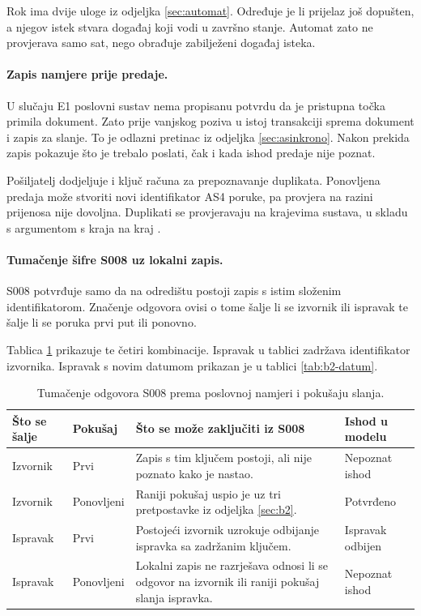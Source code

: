 Rok ima dvije uloge iz odjeljka \ref{sec:automat}. Određuje je li prijelaz
još dopušten, a njegov istek stvara događaj koji vodi u završno stanje.
Automat zato ne provjerava samo sat, nego obrađuje zabilježeni događaj
isteka.

\paragraph{Zapis namjere prije predaje.}
U slučaju E1 poslovni sustav nema propisanu potvrdu da je pristupna točka
primila dokument. Zato prije vanjskog poziva u istoj transakciji sprema
dokument i zapis za slanje. To je odlazni pretinac iz odjeljka
\ref{sec:asinkrono}. Nakon prekida zapis pokazuje što je trebalo poslati,
čak i kada ishod predaje nije poznat.

Pošiljatelj dodjeljuje i ključ računa za prepoznavanje duplikata. Ponovljena
predaja može stvoriti novi identifikator AS4 poruke, pa provjera na razini
prijenosa nije dovoljna. Duplikati se provjeravaju na krajevima sustava, u
skladu s argumentom s kraja na kraj \cite{saltzer1984endtoend}.

\paragraph{Tumačenje šifre S008 uz lokalni zapis.}
S008 potvrđuje samo da na odredištu postoji zapis s istim složenim
identifikatorom. Značenje odgovora ovisi o tome šalje li se izvornik ili
ispravak te šalje li se poruka prvi put ili ponovno.

Tablica \ref{tab:s008-tumacenje} prikazuje te četiri kombinacije. Ispravak
u tablici zadržava identifikator izvornika. Ispravak s novim datumom
prikazan je u tablici \ref{tab:b2-datum}.

\begin{table}[htbp]
\centering
\caption[Tumačenje S008 prema namjeri i pokušaju]{Tumačenje odgovora S008
prema poslovnoj namjeri i pokušaju slanja.}
\label{tab:s008-tumacenje}
\small
\begin{tabular}{@{}>{\raggedright\arraybackslash}p{}>{\raggedright\arraybackslash}p{}>{\raggedright\arraybackslash}p{}>{\raggedright\arraybackslash}p{}@{}}
\toprule
Što se šalje & Pokušaj & Što se može zaključiti iz S008 & Ishod u modelu \\
\midrule
Izvornik & Prvi & Zapis s tim ključem postoji, ali nije poznato kako je
nastao. & Nepoznat ishod \\
\addlinespace
Izvornik & Ponovljeni & Raniji pokušaj uspio je uz tri pretpostavke iz
odjeljka \ref{sec:b2}. & Potvrđeno \\
\addlinespace
Ispravak & Prvi & Postojeći izvornik uzrokuje odbijanje ispravka sa
zadržanim ključem. & Ispravak odbijen \\
\addlinespace
Ispravak & Ponovljeni & Lokalni zapis ne razrješava odnosi li se odgovor
na izvornik ili raniji pokušaj slanja ispravka. & Nepoznat ishod \\
\bottomrule
\end{tabular}
\end{table}

